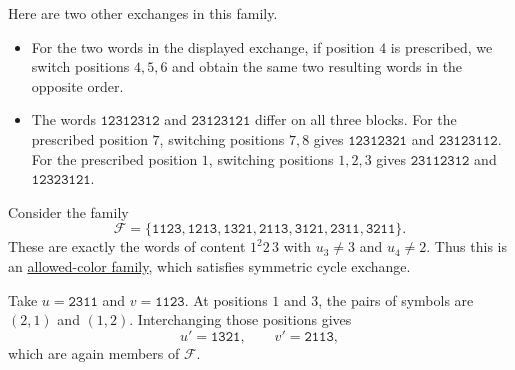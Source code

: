 \begin{example}
Here are two other exchanges in this family.
\begin{itemize}
\item For the two words in the displayed exchange, if position $4$ is
prescribed, we switch positions $4,5,6$ and obtain the same two resulting
words in the opposite order.
\item The words $\mathtt{12312312}$ and $\mathtt{23123121}$ differ on all
three blocks. For the prescribed position $7$, switching positions $7,8$
gives $\mathtt{12312321}$ and $\mathtt{23123112}$. For the prescribed
position $1$, switching positions $1,2,3$ gives $\mathtt{23112312}$ and
$\mathtt{12323121}$.
\end{itemize}
\end{example}

\begin{example}
Consider the family
\[
 \mathcal F=\{\mathtt{1123},\mathtt{1213},\mathtt{1321},
 \mathtt{2113},\mathtt{3121},\mathtt{2311},\mathtt{3211}\}.
\]
These are exactly the words of content $1^2 2\,3$ with $u_3\ne3$ and
$u_4\ne2$. Thus this is an
\href{constructions.htm#allowedColors}{allowed-color family}, which satisfies
symmetric cycle exchange.

Take $u=\mathtt{2311}$ and $v=\mathtt{1123}$. At positions $1$ and $3$, the
pairs of symbols are $(2,1)$ and $(1,2)$. Interchanging those positions gives
\[
 u'=\mathtt{1321},\qquad v'=\mathtt{2113},
\]
which are again members of $\mathcal F$.
\end{example}
